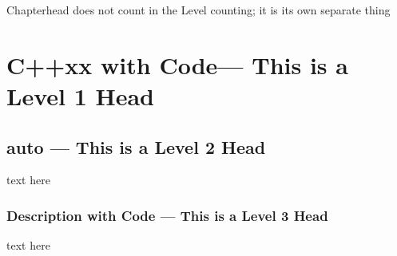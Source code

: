 Chapterhead does not count in the Level counting; it is its own separate thing

\section[C++xx with {\tt Code}]{C++xx with {\SecCode Code}--- This is a Level 1 Head} 

\subsection[{\tt auto}]{{\SubsecCode auto} --- This is a Level 2 Head}

text here

\subsubsection[Description with {\tt Code}]{Description with {\SubsubsecCode Code} --- This is a Level 3 Head}

text here

